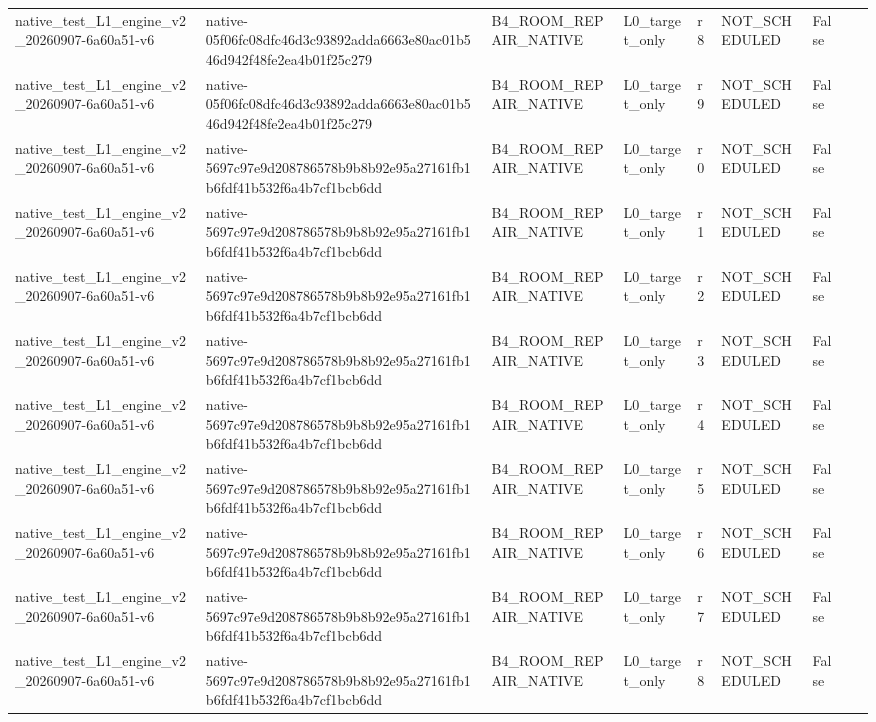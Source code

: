\begin{tabular}{lllllllll}
native\_test\_L1\_engine\_v2\_20260907-6a60a51-v6 & native-05f06fc08dfc46d3c93892adda6663e80ac01b546d942f48fe2ea4b01f25c279 & B4\_ROOM\_REPAIR\_NATIVE & L0\_target\_only & r8 & NOT\_SCHEDULED & False &  &  \\
native\_test\_L1\_engine\_v2\_20260907-6a60a51-v6 & native-05f06fc08dfc46d3c93892adda6663e80ac01b546d942f48fe2ea4b01f25c279 & B4\_ROOM\_REPAIR\_NATIVE & L0\_target\_only & r9 & NOT\_SCHEDULED & False &  &  \\
native\_test\_L1\_engine\_v2\_20260907-6a60a51-v6 & native-5697c97e9d208786578b9b8b92e95a27161fb1b6fdf41b532f6a4b7cf1bcb6dd & B4\_ROOM\_REPAIR\_NATIVE & L0\_target\_only & r0 & NOT\_SCHEDULED & False &  &  \\
native\_test\_L1\_engine\_v2\_20260907-6a60a51-v6 & native-5697c97e9d208786578b9b8b92e95a27161fb1b6fdf41b532f6a4b7cf1bcb6dd & B4\_ROOM\_REPAIR\_NATIVE & L0\_target\_only & r1 & NOT\_SCHEDULED & False &  &  \\
native\_test\_L1\_engine\_v2\_20260907-6a60a51-v6 & native-5697c97e9d208786578b9b8b92e95a27161fb1b6fdf41b532f6a4b7cf1bcb6dd & B4\_ROOM\_REPAIR\_NATIVE & L0\_target\_only & r2 & NOT\_SCHEDULED & False &  &  \\
native\_test\_L1\_engine\_v2\_20260907-6a60a51-v6 & native-5697c97e9d208786578b9b8b92e95a27161fb1b6fdf41b532f6a4b7cf1bcb6dd & B4\_ROOM\_REPAIR\_NATIVE & L0\_target\_only & r3 & NOT\_SCHEDULED & False &  &  \\
native\_test\_L1\_engine\_v2\_20260907-6a60a51-v6 & native-5697c97e9d208786578b9b8b92e95a27161fb1b6fdf41b532f6a4b7cf1bcb6dd & B4\_ROOM\_REPAIR\_NATIVE & L0\_target\_only & r4 & NOT\_SCHEDULED & False &  &  \\
native\_test\_L1\_engine\_v2\_20260907-6a60a51-v6 & native-5697c97e9d208786578b9b8b92e95a27161fb1b6fdf41b532f6a4b7cf1bcb6dd & B4\_ROOM\_REPAIR\_NATIVE & L0\_target\_only & r5 & NOT\_SCHEDULED & False &  &  \\
native\_test\_L1\_engine\_v2\_20260907-6a60a51-v6 & native-5697c97e9d208786578b9b8b92e95a27161fb1b6fdf41b532f6a4b7cf1bcb6dd & B4\_ROOM\_REPAIR\_NATIVE & L0\_target\_only & r6 & NOT\_SCHEDULED & False &  &  \\
native\_test\_L1\_engine\_v2\_20260907-6a60a51-v6 & native-5697c97e9d208786578b9b8b92e95a27161fb1b6fdf41b532f6a4b7cf1bcb6dd & B4\_ROOM\_REPAIR\_NATIVE & L0\_target\_only & r7 & NOT\_SCHEDULED & False &  &  \\
native\_test\_L1\_engine\_v2\_20260907-6a60a51-v6 & native-5697c97e9d208786578b9b8b92e95a27161fb1b6fdf41b532f6a4b7cf1bcb6dd & B4\_ROOM\_REPAIR\_NATIVE & L0\_target\_only & r8 & NOT\_SCHEDULED & False &  &  \\

\end{tabular}
